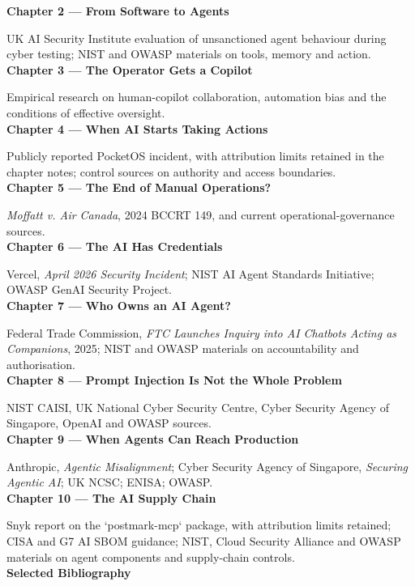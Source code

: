 \documentclass[10pt,twoside]{article}
\begin{document}
{\sffamily\bfseries Chapter 2 — From Software to Agents}\par UK AI Security Institute evaluation of unsanctioned agent behaviour during cyber testing; NIST and OWASP materials on tools, memory and action.\\[9pt]
{\sffamily\bfseries Chapter 3 — The Operator Gets a Copilot}\par Empirical research on human-copilot collaboration, automation bias and the conditions of effective oversight.\\[9pt]
{\sffamily\bfseries Chapter 4 — When AI Starts Taking Actions}\par Publicly reported PocketOS incident, with attribution limits retained in the chapter notes; control sources on authority and access boundaries.\\[9pt]
{\sffamily\bfseries Chapter 5 — The End of Manual Operations?}\par \emph{Moffatt v. Air Canada}, 2024 BCCRT 149, and current operational-governance sources.\\[9pt]
{\sffamily\bfseries Chapter 6 — The AI Has Credentials}\par Vercel, \emph{April 2026 Security Incident}; NIST AI Agent Standards Initiative; OWASP GenAI Security Project.\\[9pt]
{\sffamily\bfseries Chapter 7 — Who Owns an AI Agent?}\par Federal Trade Commission, \emph{FTC Launches Inquiry into AI Chatbots Acting as Companions}, 2025; NIST and OWASP materials on accountability and authorisation.\\[9pt]
{\sffamily\bfseries Chapter 8 — Prompt Injection Is Not the Whole Problem}\par NIST CAISI, UK National Cyber Security Centre, Cyber Security Agency of Singapore, OpenAI and OWASP sources.\\[9pt]
{\sffamily\bfseries Chapter 9 — When Agents Can Reach Production}\par Anthropic, \emph{Agentic Misalignment}; Cyber Security Agency of Singapore, \emph{Securing Agentic AI}; UK NCSC; ENISA; OWASP.\\[9pt]
{\sffamily\bfseries Chapter 10 — The AI Supply Chain}\par Snyk report on the `postmark-mcp` package, with attribution limits retained; CISA and G7 AI SBOM guidance; NIST, Cloud Security Alliance and OWASP materials on agent components and supply-chain controls.\\[18pt]
{\sffamily\bfseries\large Selected Bibliography}\par\vspace{8pt}
\end{document}
